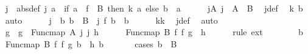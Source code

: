 \begin{isabellebody}
\ j{}\ \ {\isacharbrackleft}{\kern0pt}abs{\isacharunderscore}{\kern0pt}def{\isacharbrackright}{\kern0pt}{\isacharcolon}{\kern0pt}\ {\isachardoublequoteopen}j{}\ a{}\ {\isacharequal}{\kern0pt}\ {\isacharparenleft}{\kern0pt}if\ a{}\ {\isasymin}\ f{}\ {\isacharbackquote}{\kern0pt}\ B{}\ then\ k\ a{}\ else\ b{}{}{\isacharparenright}{\kern0pt}{\isachardoublequoteclose}\ \ a{}\isanewline
\ \ \ \ \isamarkupfalse%
\ j{}A{}{\isacharcolon}{\kern0pt}\ {\isachardoublequoteopen}j{}\ {\isacharbackquote}{\kern0pt}\ A{}\ {\isasymsubseteq}\ B{}{\isachardoublequoteclose}\ \isamarkupfalse%
\ j{}{\isacharunderscore}{\kern0pt}def\ \isamarkupfalse%
\ k\ b{}{}\ \isamarkupfalse%
\ auto\isanewline
\ \ \ \ \isamarkupfalse%
\ j{}{\isacharcolon}{\kern0pt}\ {\isachardoublequoteopen}{\isasymAnd}\ b{}{\isachardot}{\kern0pt}\ b{}\ {\isasymin}\ B{}\ {\isasymLongrightarrow}\ j{}\ {\isacharparenleft}{\kern0pt}f{}\ b{}{\isacharparenright}{\kern0pt}\ {\isacharequal}{\kern0pt}\ b{}{\isachardoublequoteclose}\isanewline
\ \ \ \ \isamarkupfalse%
\ kk\ \isamarkupfalse%
\ j{}{\isacharunderscore}{\kern0pt}def\ \isamarkupfalse%
\ auto\isanewline
\ \ \ \ \isamarkupfalse%
\ g\ \ {\isachardoublequoteopen}g\ {\isacharequal}{\kern0pt}\ Func{\isacharunderscore}{\kern0pt}map\ A{}\ j{}\ j{}\ h{\isachardoublequoteclose}\isanewline
\ \ \ \ \isamarkupfalse%
\ {\isachardoublequoteopen}Func{\isacharunderscore}{\kern0pt}map\ B{}\ f{}\ f{}\ g\ {\isacharequal}{\kern0pt}\ h{\isachardoublequoteclose}\isanewline
\ \ \ \ \isamarkupfalse%
\ {\isacharparenleft}{\kern0pt}rule\ ext{\isacharparenright}{\kern0pt}\isanewline
\ \ \ \ \ \ \isamarkupfalse%
\ b{}\ \isamarkupfalse%
\ {\isachardoublequoteopen}Func{\isacharunderscore}{\kern0pt}map\ B{}\ f{}\ f{}\ g\ b{}\ {\isacharequal}{\kern0pt}\ h\ b{}{\isachardoublequoteclose}\isanewline
\ \ \ \ \ \ \isamarkupfalse%
{\isacharparenleft}{\kern0pt}cases\ {\isachardoublequoteopen}b{}\ {\isasymin}\ B{}{\isachardoublequoteclose}{\isacharparenright}{\kern0pt}\isanewline

\end{isabellebody}

